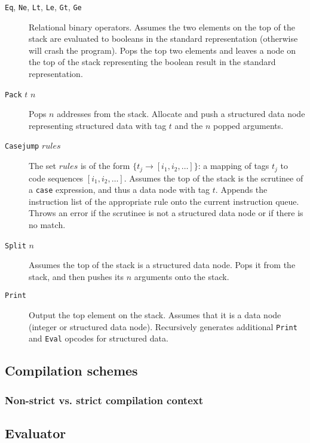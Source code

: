 \begin{description}
\item[\texttt{Eq}, \texttt{Ne}, \texttt{Lt}, \texttt{Le}, \texttt{Gt}, \texttt{Ge}] Relational binary operators. Assumes the two elements on the top of the stack are evaluated to booleans in the standard representation (otherwise will crash the program). Pops the top two elements and leaves a node on the top of the stack representing the boolean result in the standard representation.
\item[\texttt{Pack} $t$ $n$] Pops $n$ addresses from the stack. Allocate and push a structured data node representing structured data with tag $t$ and the $n$ popped arguments.
\item[\texttt{Casejump} $rules$] The set $rules$ is of the form $\{t_j\to [i_1,i_2,\dots]\}$: a mapping of tags $t_j$ to code sequences $[i_1,i_2,\dots]$. Assumes the top of the stack is the scrutinee of a \texttt{case} expression, and thus a data node with tag $t$. Appends the instruction list of the appropriate rule onto the current instruction queue. Throws an error if the scrutinee is not a structured data node or if there is no match.
\item[\texttt{Split} $n$] Assumes the top of the stack is a structured data node. Pops it from the stack, and then pushes its $n$ arguments onto the stack.
\item[\texttt{Print}] Output the top element on the stack. Assumes that it is a data node (integer or structured data node). Recursively generates additional \texttt{Print} and \texttt{Eval} opcodes for structured data.

\end{description}

\subsection{Compilation schemes}
\label{sec:compilation-schemes}


\subsubsection{Non-strict vs. strict compilation context}
\label{sec:strict-context}


\subsection{Evaluator}
\label{sec:evaluator}

